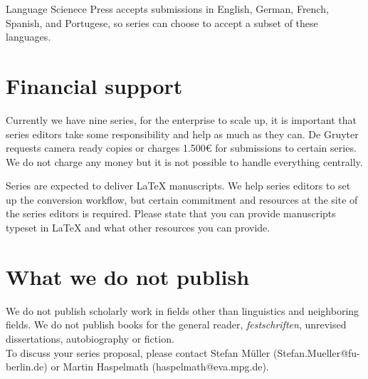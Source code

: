 \documentclass{article}
\newcommand{\latex}{\LaTeX\xspace}
\begin{document}
Language Scienece Press accepts submissions in English, German, French, Spanish,
and Portugese, so series can choose to accept a subset of these languages.



\section{Financial support}

Currently we have nine series, for the enterprise to scale up, it is important that series editors
take some responsibility and help as much as they can. De Gruyter requests camera ready copies or
charges 1.500€ for submissions to certain series. We do not charge any money but it is not possible
to handle everything centrally.

Series are expected to deliver \latex manuscripts. We help series editors to set up the conversion
workflow, but certain commitment and resources at the site of the series editors is required. Please
state that you can provide manuscripts typeset in \latex and what other resources you can provide.


\section{What we do not publish}

We do not publish scholarly work in fields other than linguistics
and neighboring fields. We do not publish books for the general reader,
\textit{festschriften}, unrevised dissertations, autobiography or
fiction.\\


To discuss your series proposal, please contact Stefan M\"{u}ller (Stefan.Mueller@fu-berlin.de) or
Martin Haspelmath (haspelmath@eva.mpg.de).
\end{document}
